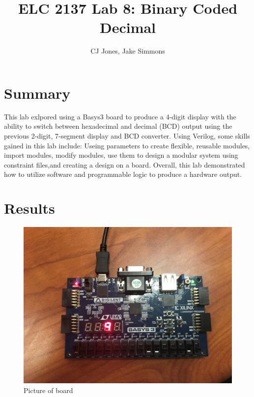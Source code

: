 \documentclass[11pt]{article}
\begin{document}
\title{ELC 2137 Lab 8: Binary Coded Decimal}
\author{CJ Jones, Jake Simmons}

\maketitle


\section*{Summary}

This lab exlpored using a Basys3 board to produce a 4-digit display with the ability to switch between hexadecimal and decimal (BCD) output using the previous 2-digit, 7-segment display and BCD converter. Using Verilog, some skills gained in this lab include:  Useing parameters to create ﬂexible, reusable modules, import modules, modify modules, use them to design a modular system using constraint files,and creating a design on a board. Overall, this lab demonstrated how to utilize software and programmable logic to produce a hardware output.













\section*{Results}


\begin{figure}[ht]\centering
	\includegraphics[width=1.0\textwidth]{9}
	\caption{Picture of board}
	\label{fig:sim_with_table}
\end{figure}
\end{document}
